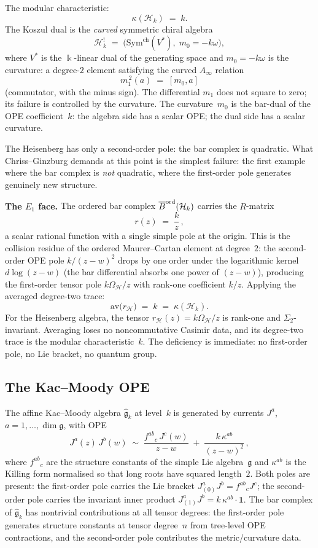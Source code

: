 The modular characteristic:
\[
\kappa(\mathcal H_k)\;=\;k.
\]
The Koszul dual is the \emph{curved} symmetric chiral algebra
\[
\mathcal H_k^!
\;=\;
\bigl(\mathrm{Sym}^{\mathrm{ch}}(V^*),\;m_0=-k\omega\bigr),
\]
where $V^*$ is the $\Bbbk$-linear dual of the generating space and
$m_0=-k\omega$ is the curvature: a degree-$2$ element satisfying
the curved $A_\infty$ relation
\[
m_1^{\,2}(a)\;=\;[m_0,a]
\]
(commutator, with the minus sign). The differential $m_1$ does not
square to zero; its failure is controlled by the curvature. The
curvature~$m_0$ is the bar-dual of the OPE coefficient~$k$:
the algebra side has a scalar OPE; the dual side has a scalar
curvature.

The Heisenberg has only a second-order pole: the bar complex is
quadratic. What Chriss--Ginzburg demands at this point is the simplest
failure: the first example where the bar complex is \emph{not} quadratic,
where the first-order pole generates genuinely new structure.

\medskip
\noindent\textbf{The $E_1$ face.}\enspace
The ordered bar complex $\overline{B}^{\mathrm{ord}}(\mathcal H_k)$ carries
the $R$-matrix
\[
r(z) \;=\; \frac{k}{z}\,,
\]
a scalar rational function with a single simple pole at the origin.
This is the collision residue of the ordered Maurer--Cartan element at
degree~$2$: the second-order OPE pole $k/(z-w)^2$ drops by one order
under the logarithmic kernel $d\log(z-w)$ (the bar differential
absorbs one power of $(z-w)$), producing the first-order tensor pole
$k\Omega_{\mathcal H}/z$ with rank-one coefficient $k/z$. Applying the
averaged degree-two trace:
\[
\mathrm{av}\bigl(r_{\mathcal H}\bigr) \;=\; k \;=\; \kappa(\mathcal H_k).
\]
For the Heisenberg algebra, the tensor
$r_{\mathcal H}(z)=k\Omega_{\mathcal H}/z$ is rank-one and
$\Sigma_2$-invariant. Averaging loses no noncommutative Casimir data,
and its degree-two trace is the modular characteristic~$k$.
The deficiency is immediate: no first-order pole, no Lie bracket, no
quantum group.


\subsection*{The Kac--Moody OPE}

The affine Kac--Moody algebra $\widehat{\mathfrak g}_k$ at level~$k$
is generated by currents $J^a$, $a=1,\dots,\dim\mathfrak g$, with
OPE
\[
J^a(z)\,J^b(w)
\;\sim\;
\frac{f^{ab}{}_{c}\,J^c(w)}{z-w}
\;+\;
\frac{k\,\kappa^{ab}}{(z-w)^2}\,,
\]
where $f^{ab}{}_{c}$ are the structure constants of the simple Lie
algebra~$\mathfrak g$ and $\kappa^{ab}$ is the Killing form
normalised so that long roots have squared length~$2$. Both poles
are present: the first-order pole carries the Lie bracket
$J^a_{(0)}J^b=f^{ab}{}_{c}J^c$; the second-order pole carries
the invariant inner product
$J^a_{(1)}J^b=k\,\kappa^{ab}\cdot\mathbf 1$. The bar complex
of $\widehat{\mathfrak g}_k$ has nontrivial contributions
at all tensor degrees: the first-order pole generates structure
constants at tensor degree~$n$ from tree-level OPE contractions,
and the second-order pole contributes the metric/curvature data.

